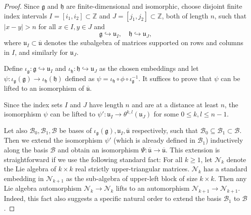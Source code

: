 \documentclass[12pt]{amsart}
\theoremstyle{definition}
\begin{document}
\begin{proof}
Since \( \mathfrak{g} \) and \( \mathfrak{h} \) are finite-dimensional and isomorphic, choose disjoint finite index intervals \( I = [i_1, i_2] \subset \mathbb{Z} \) and \( J = [j_1, j_2] \subset \mathbb{Z} \), both of length \( n \), such that $|x-y| > n$ for all $x\in I, y\in J$ and 
\[
\mathfrak{g} \hookrightarrow \mathfrak{u}_I,\quad \mathfrak{h} \hookrightarrow \mathfrak{u}_J,
\]
where \( \mathfrak{u}_I \subset \overline{\mathfrak{u}} \) denotes the subalgebra of matrices supported on rows and columns in \( I \), and similarly for \( \mathfrak{u}_J \).

\medskip 

Define \( \iota_{\mathfrak{g}} : \mathfrak{g} \hookrightarrow \mathfrak{u}_I \) and \( \iota_{\mathfrak{h}} : \mathfrak{h} \hookrightarrow \mathfrak{u}_J \) as the chosen embeddings and let $\psi : \iota_{\mathfrak{g}}(\mathfrak{g})\to \iota_{\mathfrak{h}}(\mathfrak{h})$ defined as $\psi =                \iota_{\mathfrak{h}}\circ \phi \circ \iota_{\mathfrak{g}}^{-1}$. It suffices to prove that $\psi $ can be lifted to an isomorphism of \(\overline{ \mathfrak{u}} \). 

\medskip 

 Since the index sets $I$ and $J$ have length $n$ and are at a distance at least $n$, the isomorphism $\psi $ can be lifted to $\psi ':\mathfrak{u}_I\to \theta ^{k,l}(\mathfrak{u}_J)$ for some $0\leq k, l\leq n-1$.  

\medskip 

 Let also $\mathcal{B}_0, \mathcal{B}_1, \mathcal{B}$ be bases of $\iota_{\mathfrak{g}}(\mathfrak{g}), \mathfrak{u}_I, \overline{\mathfrak{u}}$ respectively, such that $\mathcal{B}_0\subseteq \mathcal{B}_1\subset \mathcal{B}$. Then we extend the isomorphism $\psi '$ (which is already defined in $\mathcal{B}_1$) inductively along the basis $\mathcal{B}$ and obtain an isomorphism $\Psi : \overline{\mathfrak{u}}\to \overline{\mathfrak{u}}$. This extension is straightforward if we use the following standard fact: For all $k\geq 1$, let $\mathcal{N}_k$ denote the Lie algebra of $k\times k$ real strictly upper-triangular matrices. $\mathcal{N}_k$ has a standard embedding in $\mathcal{N}_{k+1}$ as the sub-algebra of upper-left block of size $k\times k$.  Then any Lie algebra automorphism $\mathcal{N}_k\to \mathcal{N}_k$ lifts to an automorphism $\mathcal{N}_{k+1}\to \mathcal{N}_{k+1}$. Indeed, this fact also suggests a specific natural order to extend the basis $\mathcal{B}_1$ to $\mathcal{B}$.


\end{proof}
  
\end{document}
